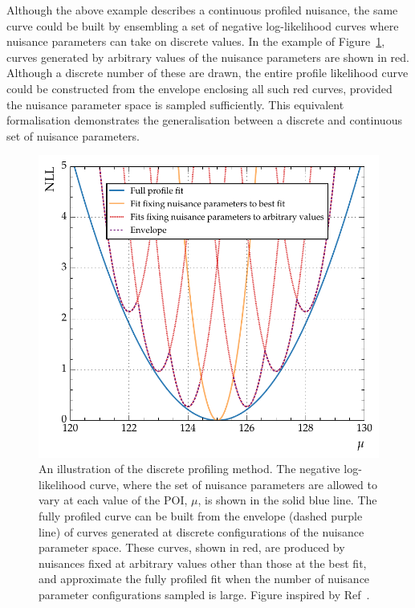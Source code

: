 Although the above example describes a continuous profiled nuisance, the same curve could be built by ensembling a set of negative log-likelihood curves where nuisance parameters can take on discrete values. In the example of Figure~\ref{fig:hee_disc_prof_plot}, curves generated by arbitrary values of the nuisance parameters are shown in red. Although a discrete number of these are drawn, the entire profile likelihood curve could be constructed from the envelope enclosing all such red curves, provided the nuisance parameter space is sampled sufficiently. %
This equivalent formalisation demonstrates the generalisation between a discrete and continuous set of nuisance parameters.

\begin{figure}[htbp!]
\centering
\includegraphics[width =0.6\linewidth]{Figures/Hee/Results/bkgModels/DPM.pdf}\hfill%
\caption[An illustration of the discrete profiling method.]{An illustration of the discrete profiling method. The negative log-likelihood curve, where the set of nuisance parameters are allowed to vary at each value of the POI, $\mu$, is shown in the solid blue line. The fully profiled curve can be built from the envelope (dashed purple line) of curves generated at discrete configurations of the nuisance parameter space. These  curves, shown in red, are produced by nuisances fixed at arbitrary values other than those at the best fit, and approximate the fully profiled fit when the number of nuisance parameter configurations sampled is large. Figure inspired by Ref~\cite{envelope_method}.}
\label{fig:hee_disc_prof_plot}
\end{figure} 

